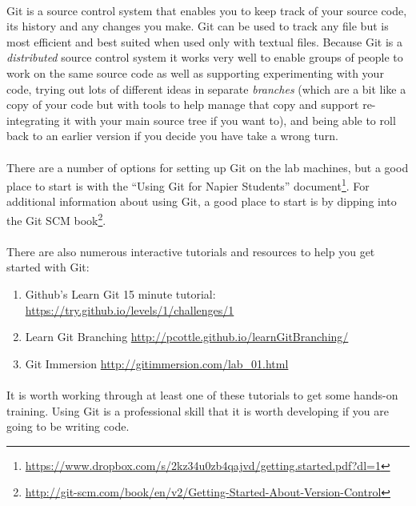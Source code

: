 \documentclass[10pt, a4paper, twosize]{article}
\begin{document}
\paragraph{} Git is a source control system that enables you to keep track of your source code, its history and any changes you make. Git can be used to track any file but is most efficient and best suited when used only with textual files. Because Git is a \emph{distributed} source control system it works very well to enable groups of people to work on the same source code as well as supporting experimenting with your code, trying out lots of different ideas in separate \emph{branches} (which are a bit like a copy of your code but with tools to help manage that copy and support re-integrating it with your main source tree if you want to), and being able to roll back to an earlier version if you decide you have take a wrong turn.

\paragraph{} There are a number of options for setting up Git on the lab machines, but a good place to start is with the ``Using Git for Napier Students'' document\footnote{\url{https://www.dropbox.com/s/2kz34u0zb4qajvd/getting.started.pdf?dl=1}}. For additional information about using Git, a good place to start is by dipping into the Git SCM book\footnote{\url{http://git-scm.com/book/en/v2/Getting-Started-About-Version-Control}}.


\paragraph{} There are also numerous interactive tutorials and resources to help you get started with Git:
\begin{enumerate}
\item Github's Learn Git 15 minute tutorial: \url{https://try.github.io/levels/1/challenges/1}
\item Learn Git Branching \url{http://pcottle.github.io/learnGitBranching/}
\item Git Immersion \url{http://gitimmersion.com/lab_01.html}
\end{enumerate}

\paragraph{} It is worth working through at least one of these tutorials to get some hands-on training. Using Git is a professional skill that it is worth developing if you are going to be writing code.
\end{document}
